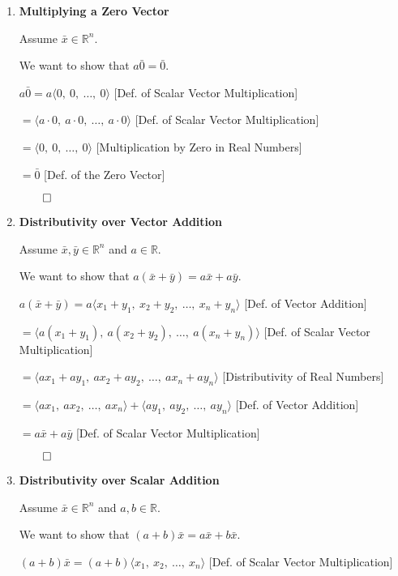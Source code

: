 \begin{proofbox}
\begin{enumerate}[label=\arabic*., resume=vecprops]

\item \textbf{Multiplying a Zero Vector}

Assume $\bar{x} \in \mathbb{R}^n$.

We want to show that $a\bar{0} = \bar{0}$.

\quad $a\bar{0} = a\langle 0,\ 0,\ \ldots,\ 0 \rangle$ \hfill [Def. of Scalar Vector Multiplication]

\quad $= \langle a \cdot 0,\ a \cdot 0,\ \ldots,\ a \cdot 0 \rangle$ \hfill [Def. of Scalar Vector Multiplication]

\quad $= \langle 0,\ 0,\ \ldots,\ 0 \rangle$ \hfill [Multiplication by Zero in Real Numbers]

\quad $= \bar{0}$ \hfill [Def. of the Zero Vector]

\hfill $\qed$

\item \textbf{Distributivity over Vector Addition}

Assume $\bar{x}, \bar{y} \in \mathbb{R}^n$ and $a \in \mathbb{R}$.

We want to show that $a(\bar{x} + \bar{y}) = a\bar{x} + a\bar{y}$.

\quad $a(\bar{x} + \bar{y}) = a\langle x_1 + y_1,\ x_2 + y_2,\ \ldots,\ x_n + y_n \rangle$ \hfill [Def. of Vector Addition]

\quad $= \langle a(x_1 + y_1),\ a(x_2 + y_2),\ \ldots,\ a(x_n + y_n) \rangle$ \hfill [Def. of Scalar Vector Multiplication]

\quad $= \langle ax_1 + ay_1,\ ax_2 + ay_2,\ \ldots,\ ax_n + ay_n \rangle$ \hfill [Distributivity of Real Numbers]

\quad $= \langle ax_1,\ ax_2,\ \ldots,\ ax_n \rangle + \langle ay_1,\ ay_2,\ \ldots,\ ay_n \rangle$ \hfill [Def. of Vector Addition]

\quad $= a\bar{x} + a\bar{y}$ \hfill [Def. of Scalar Vector Multiplication]

\hfill $\qed$

\item \textbf{Distributivity over Scalar Addition}

Assume $\bar{x} \in \mathbb{R}^n$ and $a, b \in \mathbb{R}$.

We want to show that $(a + b)\bar{x} = a\bar{x} + b\bar{x}$.

\quad $(a + b)\bar{x} = (a + b)\langle x_1,\ x_2,\ \ldots,\ x_n \rangle$ \hfill [Def. of Scalar Vector Multiplication]


\end{enumerate}
\end{proofbox}
